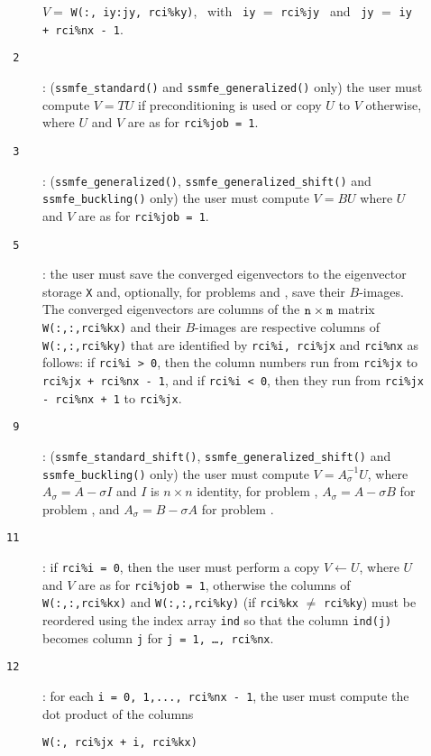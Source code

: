 \begin{description}
\begin{description}
\hspace{8mm}
$V=$ {\tt W(:, iy:jy, rci\%ky)},
~with~ {\tt iy} $=$ {\tt rci\%jy} 
~and~
{\tt jy} $=$ {\tt iy + rci\%nx - 1}.
%
\item[\texttt{~2}]:
({\tt ssmfe\_standard()} and {\tt ssmfe\_generalized()} only)
the user must
compute $V = T U$ if preconditioning is used
or copy $U$ to $V$ otherwise,
where $U$ and $V$ are as for {\tt rci\%job = 1}.
%
\item[\texttt{~3}]:
({\tt ssmfe\_generalized()}, {\tt ssmfe\_generalized\_shift()} 
and {\tt ssmfe\_buckling()} only)
the user must compute $V = B U$ 
where $U$ and $V$ are as for {\tt rci\%job = 1}.
%
\item[\texttt{~5}]: the user must save the converged eigenvectors
to the eigenvector storage {\tt X}
and, optionally, 
for problems  and ,
save their $B$-images.
The converged eigenvectors are columns of the ${\tt n}\times {\tt m}$ matrix
{\tt W(:,:,rci\%kx)} and their $B$-images are respective columns of
{\tt W(:,:,rci\%ky)}
that are identified by
{\tt rci\%i, rci\%jx} and {\tt rci\%nx}
as follows:
if {\tt rci\%i > 0}, then the column numbers
run from {\tt rci\%jx} to {\tt rci\%jx + rci\%nx - 1},
and if {\tt rci\%i < 0}, then they run
from {\tt rci\%jx - rci\%nx + 1} to {\tt rci\%jx}.
%
\item[\texttt{~9}]:
({\tt ssmfe\_standard\_shift()}, {\tt ssmfe\_generalized\_shift()}
and {\tt ssmfe\_buckling()} only)
the user must compute $V = A_\sigma^{-1} U$, where
$A_\sigma = A - \sigma I$
and $I$ is $n\times n$ identity,
for problem , 
$A_\sigma = A - \sigma B$ for problem ,
and 
$A_\sigma = B - \sigma A$ for problem .
%
\item[\texttt{11}]:
if {\tt rci\%i = 0}, then
the user  must perform a copy $V \leftarrow U$, 
where $U$ and $V$ are as for {\tt rci\%job = 1},
otherwise the columns of {\tt W(:,:,rci\%kx)}
and {\tt W(:,:,rci\%ky)}
(if {\tt rci\%kx} $\not=$ {\tt rci\%ky}) 
must be reordered using
the index array {\tt ind} so that %
the column {\tt ind(j)} becomes column {\tt j}
for {\tt j = 1, \ldots, rci\%nx}.
%
\item[\texttt{12}]:
for each
{\tt i = 0, 1,..., rci\%nx - 1}, 
the user must compute the dot product of
the columns 

\hspace{8mm}
{\tt W(:, rci\%jx + i, rci\%kx)} 


\end{description}
\end{description}
